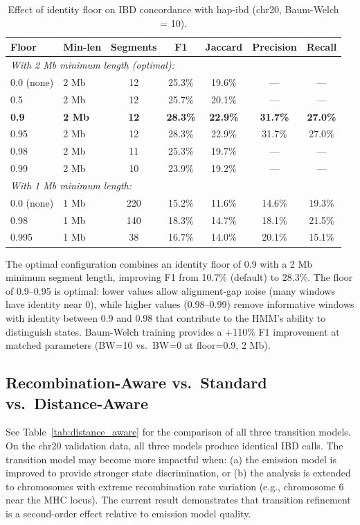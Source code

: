 \documentclass[11pt]{article}
\begin{document}
\begin{table}[ht]
\centering
\caption{Effect of identity floor on IBD concordance with hap-ibd (chr20, Baum-Welch = 10).}
\label{tab:identity_floor}
\begin{tabular}{llccccc}
\hline
\textbf{Floor} & \textbf{Min-len} & \textbf{Segments} & \textbf{F1} & \textbf{Jaccard} & \textbf{Precision} & \textbf{Recall} \\
\hline
\multicolumn{7}{l}{\textit{With 2 Mb minimum length (optimal):}} \\
0.0 (none) & 2 Mb & 12 & 25.3\% & 19.6\% & --- & --- \\
0.5 & 2 Mb & 12 & 25.7\% & 20.1\% & --- & --- \\
\textbf{0.9} & \textbf{2 Mb} & \textbf{12} & \textbf{28.3\%} & \textbf{22.9\%} & \textbf{31.7\%} & \textbf{27.0\%} \\
0.95 & 2 Mb & 12 & 28.3\% & 22.9\% & 31.7\% & 27.0\% \\
0.98 & 2 Mb & 11 & 25.3\% & 19.7\% & --- & --- \\
0.99 & 2 Mb & 10 & 23.9\% & 19.2\% & --- & --- \\
\hline
\multicolumn{7}{l}{\textit{With 1 Mb minimum length:}} \\
0.0 (none) & 1 Mb & 220 & 15.2\% & 11.6\% & 14.6\% & 19.3\% \\
0.98 & 1 Mb & 140 & 18.3\% & 14.7\% & 18.1\% & 21.5\% \\
0.995 & 1 Mb & 38 & 16.7\% & 14.0\% & 20.1\% & 15.1\% \\
\hline
\end{tabular}
\end{table}

The optimal configuration combines an identity floor of 0.9 with a 2 Mb minimum segment length, improving F1 from 10.7\% (default) to 28.3\%. The floor of 0.9--0.95 is optimal: lower values allow alignment-gap noise (many windows have identity near 0), while higher values (0.98--0.99) remove informative windows with identity between 0.9 and 0.98 that contribute to the HMM's ability to distinguish states. Baum-Welch training provides a $+$110\% F1 improvement at matched parameters (BW=10 vs.\ BW=0 at floor=0.9, 2 Mb).

\subsection{Recombination-Aware vs.\ Standard vs.\ Distance-Aware}

See Table~\ref{tab:distance_aware} for the comparison of all three transition models. On the chr20 validation data, all three models produce identical IBD calls. The transition model may become more impactful when: (a) the emission model is improved to provide stronger state discrimination, or (b) the analysis is extended to chromosomes with extreme recombination rate variation (e.g., chromosome 6 near the MHC locus). The current result demonstrates that transition refinement is a second-order effect relative to emission model quality.
\end{document}
